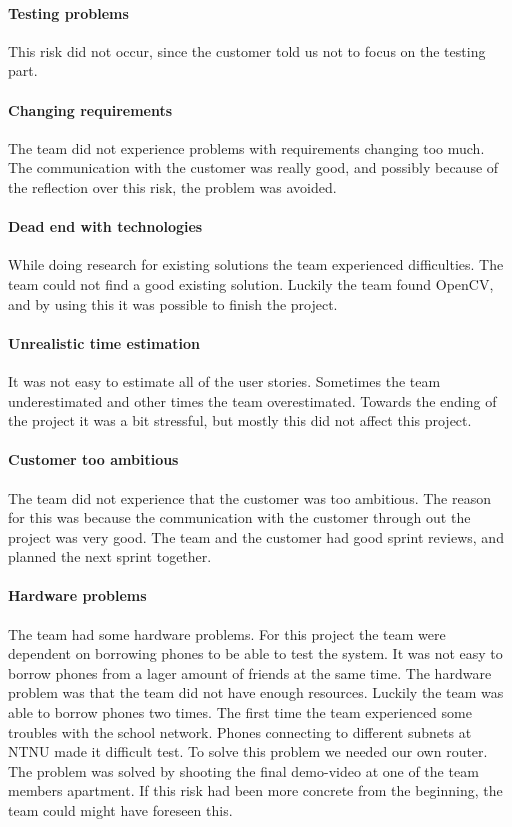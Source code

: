 \paragraph{Testing problems}
This risk did not occur, since the customer told us not to focus on the testing part.

\paragraph{Changing requirements} 
The team did not experience problems with requirements changing too much. The communication with the customer was really good, and possibly because of the reflection over this risk, the problem was avoided.

\paragraph{Dead end with technologies}
While doing research for existing solutions the team experienced difficulties. The team could not find a good existing solution. Luckily the team found OpenCV, and by using this it was possible to finish the project. 

\paragraph{Unrealistic time estimation}
It was not easy to estimate all of the user stories. Sometimes the team underestimated and other times the team overestimated. Towards the ending of the project it was a bit stressful, but mostly this did not affect this project.

\paragraph{Customer too ambitious}
The team did not experience that the customer was too ambitious. The reason for this was because the communication with the customer through out the project was very good. The team and the customer had good sprint reviews, and planned the next sprint together.

\paragraph{Hardware problems}
The team had some hardware problems. For this project the team were dependent on borrowing phones to be able to test the system. It was not easy to borrow phones from a lager amount of friends at the same time. The hardware problem was that the team did not have enough resources. Luckily the team was able to borrow phones two times. The first time the team experienced some troubles with the school network. Phones connecting to different subnets at NTNU made it difficult test. To solve this problem we needed our own router. The problem was solved by shooting the final demo-video at one of the team members apartment. If this risk had been more concrete from the beginning, the team could might have foreseen this.  


